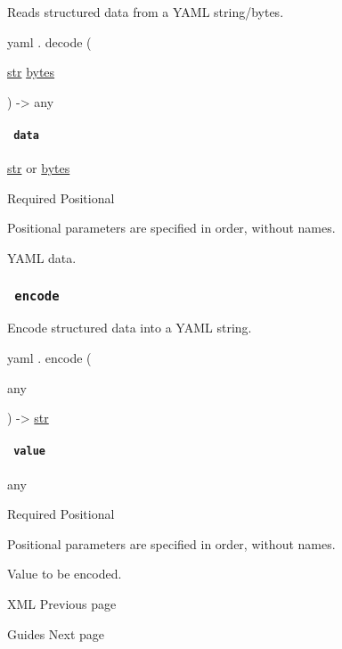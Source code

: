 Reads structured data from a YAML string/bytes.

yaml { . } { decode } (

{ \href{/docs/reference/foundations/str/}{str}
\href{/docs/reference/foundations/bytes/}{bytes} }

) -\textgreater{} { any }

\paragraph{\texorpdfstring{\texttt{\ data\ }}{ data }}\label{definitions-decode-data}

\href{/docs/reference/foundations/str/}{str} {or}
\href{/docs/reference/foundations/bytes/}{bytes}

{Required} {{ Positional }}

\label{definitions-decode-data-positional-tooltip}
Positional parameters are specified in order, without names.

YAML data.

\subsubsection{\texorpdfstring{\texttt{\ encode\ }}{ encode }}\label{definitions-encode}

Encode structured data into a YAML string.

yaml { . } { encode } (

{ { any } }

) -\textgreater{} \href{/docs/reference/foundations/str/}{str}

\paragraph{\texorpdfstring{\texttt{\ value\ }}{ value }}\label{definitions-encode-value}

{ any }

{Required} {{ Positional }}

\label{definitions-encode-value-positional-tooltip}
Positional parameters are specified in order, without names.

Value to be encoded.

\href{/docs/reference/data-loading/xml/}{\pandocbounded{}}

{ XML } { Previous page }

\href{/docs/guides/}{\pandocbounded{}}

{ Guides } { Next page }
